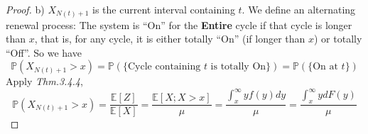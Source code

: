 \documentclass[a4paper, 10pt]{article}
\theoremstyle{definition}
\theoremstyle{hSol}
\begin{document}
\begin{proof} b) $X_{N(t)+1}$ is the current interval containing $t$. We define an alternating renewal process: The system is ``On'' for the \textbf{Entire} cycle if that cycle is longer than $x$, that is, for any cycle, it is either totally ``On'' (if longer than $x$) or totally ``Off''. So we have
\begin{equation}
    \mathbb{P}\left(X_{N(t)+1}>x\right) = \mathbb{P}\left(\{\text{Cycle containing $t$ is totally On}\}\right) = \mathbb{P}\left(\{\text{On at }t\}\right)
\end{equation}
Apply \textit{Thm.3.4.4},
\begin{equation}
  \mathbb{P}\left(X_{N(t)+1}>x\right) = \frac{\mathbb{E}\left[Z\right]}{\mathbb{E}\left[X\right]} = \frac{\mathbb{E}\left[X;X>x\right]}{\mu} = \frac{\int_x^{\infty} yf(y)dy}{\mu} = \frac{\int_x^{\infty} ydF(y)}{\mu}
\end{equation}
\end{proof}
\end{document}
